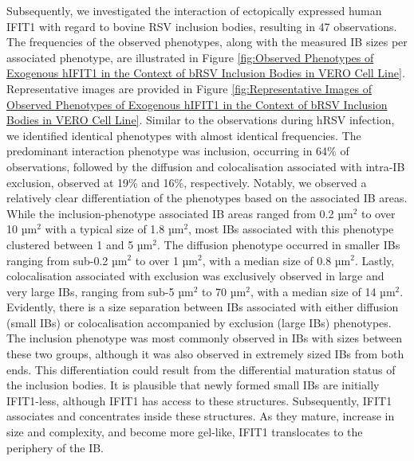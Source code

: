 Subsequently, we investigated the interaction of ectopically expressed human IFIT1 with regard to bovine RSV inclusion bodies, resulting in 47 observations. The frequencies of the observed phenotypes, along with the measured IB sizes per associated phenotype, are illustrated in Figure \ref{fig:Observed Phenotypes of Exogenous hIFIT1 in the Context of bRSV Inclusion Bodies in VERO Cell Line}. Representative images are provided in Figure \ref{fig:Representative Images of Observed Phenotypes of Exogenous hIFIT1 in the Context of bRSV Inclusion Bodies in VERO Cell Line}. Similar to the observations during hRSV infection, we identified identical phenotypes with almost identical frequencies. The predominant interaction phenotype was inclusion, occurring in 64\% of observations, followed by the diffusion and colocalisation associated with intra-IB exclusion, observed at 19\% and 16\%, respectively. Notably, we observed a relatively clear differentiation of the phenotypes based on the associated IB areas. While the inclusion-phenotype associated IB areas ranged from 0.2 \(\mbox{µm}^2\) to over 10 \(\mbox{µm}^2\) with a typical size of 1.8 \(\mbox{µm}^2\), most IBs associated with this phenotype clustered between 1 and 5 \(\mbox{µm}^2\). The diffusion phenotype occurred in smaller IBs ranging from sub-0.2 \(\mbox{µm}^2\) to over 1 \(\mbox{µm}^2\), with a median size of 0.8 \(\mbox{µm}^2\). Lastly, colocalisation associated with exclusion was exclusively observed in large and very large IBs, ranging from sub-5 \(\mbox{µm}^2\) to 70 \(\mbox{µm}^2\), with a median size of 14 \(\mbox{µm}^2\). Evidently, there is a size separation between IBs associated with either diffusion (small IBs) or colocalisation accompanied by exclusion (large IBs) phenotypes. The inclusion phenotype was most commonly observed in IBs with sizes between these two groups, although it was also observed in extremely sized IBs from both ends. This differentiation could result from the differential maturation status of the inclusion bodies. It is plausible that newly formed small IBs are initially IFIT1-less, although IFIT1 has access to these structures. Subsequently, IFIT1 associates and concentrates inside these structures. As they mature, increase in size and complexity, and become more gel-like, IFIT1 translocates to the periphery of the IB.

